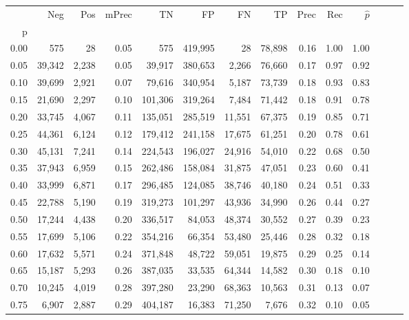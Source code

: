 \begin{tabular}{rrrrrrrrrrrrrr}
\toprule
{} &     Neg &    Pos & mPrec &       TN &       FP &      FN &      TP &  Prec &   Rec & $\hat{p}$ \\
p    &         &        &       &          &          &         &         &       &       &           \\
\midrule
0.00 &     575 &     28 &  0.05 &      575 &  419,995 &      28 &  78,898 &  0.16 &  1.00 &      1.00 \\
0.05 &  39,342 &  2,238 &  0.05 &   39,917 &  380,653 &   2,266 &  76,660 &  0.17 &  0.97 &      0.92 \\
0.10 &  39,699 &  2,921 &  0.07 &   79,616 &  340,954 &   5,187 &  73,739 &  0.18 &  0.93 &      0.83 \\
0.15 &  21,690 &  2,297 &  0.10 &  101,306 &  319,264 &   7,484 &  71,442 &  0.18 &  0.91 &      0.78 \\
0.20 &  33,745 &  4,067 &  0.11 &  135,051 &  285,519 &  11,551 &  67,375 &  0.19 &  0.85 &      0.71 \\
0.25 &  44,361 &  6,124 &  0.12 &  179,412 &  241,158 &  17,675 &  61,251 &  0.20 &  0.78 &      0.61 \\
0.30 &  45,131 &  7,241 &  0.14 &  224,543 &  196,027 &  24,916 &  54,010 &  0.22 &  0.68 &      0.50 \\
0.35 &  37,943 &  6,959 &  0.15 &  262,486 &  158,084 &  31,875 &  47,051 &  0.23 &  0.60 &      0.41 \\
0.40 &  33,999 &  6,871 &  0.17 &  296,485 &  124,085 &  38,746 &  40,180 &  0.24 &  0.51 &      0.33 \\
0.45 &  22,788 &  5,190 &  0.19 &  319,273 &  101,297 &  43,936 &  34,990 &  0.26 &  0.44 &      0.27 \\
0.50 &  17,244 &  4,438 &  0.20 &  336,517 &   84,053 &  48,374 &  30,552 &  0.27 &  0.39 &      0.23 \\
0.55 &  17,699 &  5,106 &  0.22 &  354,216 &   66,354 &  53,480 &  25,446 &  0.28 &  0.32 &      0.18 \\
0.60 &  17,632 &  5,571 &  0.24 &  371,848 &   48,722 &  59,051 &  19,875 &  0.29 &  0.25 &      0.14 \\
0.65 &  15,187 &  5,293 &  0.26 &  387,035 &   33,535 &  64,344 &  14,582 &  0.30 &  0.18 &      0.10 \\
0.70 &  10,245 &  4,019 &  0.28 &  397,280 &   23,290 &  68,363 &  10,563 &  0.31 &  0.13 &      0.07 \\
0.75 &   6,907 &  2,887 &  0.29 &  404,187 &   16,383 &  71,250 &   7,676 &  0.32 &  0.10 &      0.05 \\

\end{tabular}
